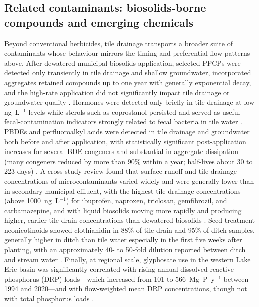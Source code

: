 \subsection{Related contaminants: biosolids-borne compounds and emerging chemicals}
Beyond conventional herbicides, tile drainage transports a broader suite of contaminants whose behaviour mirrors the timing and preferential-flow patterns above. After dewatered municipal biosolids application, selected PPCPs were detected only transiently in tile drainage and shallow groundwater, incorporated aggregates retained compounds up to one year with generally exponential decay, and the high-rate application did not significantly impact tile drainage or groundwater quality \parencite{Gottschall2012}. Hormones were detected only briefly in tile drainage at low ng~L$^{-1}$ levels while sterols such as coprostanol persisted and served as useful fecal-contamination indicators strongly related to fecal bacteria in tile water \parencite{Gottschall2013}. PBDEs and perfluoroalkyl acids were detected in tile drainage and groundwater both before and after application, with statistically significant post-application increases for several BDE congeners and substantial in-aggregate dissipation (many congeners reduced by more than 90\% within a year; half-lives about 30 to 223 days) \parencite{Gottschall2017}. A cross-study review found that surface runoff and tile-drainage concentrations of microcontaminants varied widely and were generally lower than in secondary municipal effluent, with the highest tile-drainage concentrations (above 1000~ng~L$^{-1}$) for ibuprofen, naproxen, triclosan, gemfibrozil, and carbamazepine, and with liquid biosolids moving more rapidly and producing higher, earlier tile-drain concentrations than dewatered biosolids \parencite{Ghirardini2019}. Seed-treatment neonicotinoids showed clothianidin in 88\% of tile-drain and 95\% of ditch samples, generally higher in ditch than tile water especially in the first five weeks after planting, with an approximately 40- to 50-fold dilution reported between ditch and stream water \parencite{Schaafsma2019}. Finally, at regional scale, glyphosate use in the western Lake Erie basin was significantly correlated with rising annual dissolved reactive phosphorus (DRP) loads---which increased from 101 to 566~Mg~P~y$^{-1}$ between 1994 and 2020---and with flow-weighted mean DRP concentrations, though not with total phosphorus loads \parencite{Spiese2023}.